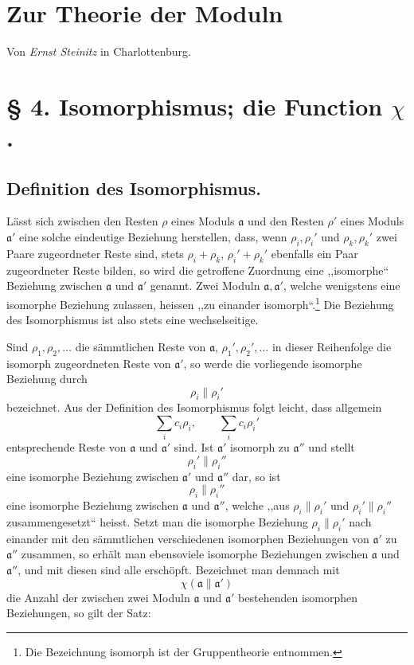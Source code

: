 \documentclass[11pt,a4paper]{article}
\begin{document}
\section*{Zur Theorie der Moduln}
\begin{center}
Von \emph{Ernst Steinitz} in Charlottenburg.
\end{center}
\section*{§ 4. Isomorphismus; die Function $\chi$.}

\subsection*{Definition des Isomorphismus.}

Lässt sich zwischen den Resten $\rho$ eines Moduls $\mathfrak a$ und den Resten $\rho'$ eines Moduls $\mathfrak a'$ eine solche eindeutige Beziehung herstellen, dass, wenn $\rho_i,\rho_i'$ und $\rho_k,\rho_k'$ zwei Paare zugeordneter Reste sind, stets $\rho_i+\rho_k$, $\rho_i'+\rho_k'$ ebenfalls ein Paar zugeordneter Reste bilden, so wird die getroffene Zuordnung eine ,,isomorphe`` Beziehung zwischen $\mathfrak a$ und $\mathfrak a'$ genannt. Zwei Moduln $\mathfrak a,\mathfrak a'$, welche wenigstens eine isomorphe Beziehung zulassen, heissen ,,zu einander isomorph``.\footnote{Die Bezeichnung isomorph ist der Gruppentheorie entnommen.} Die Beziehung des Isomorphismus ist also stets eine wechselseitige.

Sind $\rho_1,\rho_2,\ldots$ die sämmtlichen Reste von $\mathfrak a$, $\rho_1',\rho_2',\ldots$ in dieser Reihenfolge die isomorph zugeordneten Reste von $\mathfrak a'$, so werde die vorliegende isomorphe Beziehung durch
\[
 \rho_i\parallel \rho_i'
\]
bezeichnet. Aus der Definition des Isomorphismus folgt leicht, dass allgemein
\[
 \sum_i c_i\rho_i,
 \qquad
 \sum_i c_i\rho_i'
\]
entsprechende Reste von $\mathfrak a$ und $\mathfrak a'$ sind. Ist $\mathfrak a'$ isomorph zu $\mathfrak a''$ und stellt
\[
 \rho_i'\parallel \rho_i''
\]
eine isomorphe Beziehung zwischen $\mathfrak a'$ und $\mathfrak a''$ dar, so ist
\[
 \rho_i\parallel \rho_i''
\]
eine isomorphe Beziehung zwischen $\mathfrak a$ und $\mathfrak a''$, welche ,,aus $\rho_i\parallel\rho_i'$ und $\rho_i'\parallel\rho_i''$ zusammengesetzt`` heisst. Setzt man die isomorphe Beziehung $\rho_i\parallel\rho_i'$ nach einander mit den sämmtlichen verschiedenen isomorphen Beziehungen von $\mathfrak a'$ zu $\mathfrak a''$ zusammen, so erhält man ebensoviele isomorphe Beziehungen zwischen $\mathfrak a$ und $\mathfrak a''$, und mit diesen sind alle erschöpft. Bezeichnet man demnach mit
\[
 \chi(\mathfrak a\parallel\mathfrak a')
\]
die Anzahl der zwischen zwei Moduln $\mathfrak a$ und $\mathfrak a'$ bestehenden isomorphen Beziehungen, so gilt der Satz:
\end{document}
